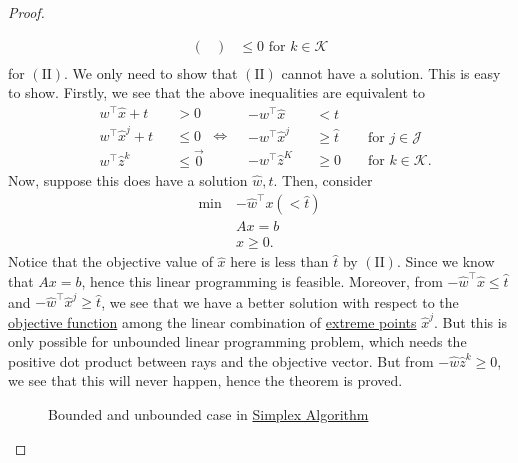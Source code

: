 \begin{proof}
\begin{enumerate}
\[\begin{split}
\begin{pmatrix}
				                   \end{pmatrix} & \leq 0 \text{ for }k\in\mathcal{K} \\
			      \end{split}
		      \]
		      for \((\mathrm{II})\). We only need to show that \((\mathrm{II})\) cannot have a solution. This is easy to show. Firstly, we see that the above inequalities are equivalent to
		      \[
			      \begin{alignedat}{3}
				       & w^{\top}\hat{x}+t     &  & >0           \\
				       & w^{\top}\hat{x}^j + t &  & \leq 0       \\
				       & w^{\top}\hat{z}^k     &  & \leq \vec{0}
			      \end{alignedat}\iff\begin{alignedat}{3}
				       & -w^{\top}\hat{x}   &  & <t                                             \\
				       & -w^{\top}\hat{x}^j &  & \geq \hat{t} &  & \text{ for }j\in\mathcal{J}  \\
				       & -w^{\top}\hat{z}^K &  & \geq 0       &  & \text{ for }k\in\mathcal{K}.
			      \end{alignedat}
		      \]
		      Now, suppose this does have a solution \(\hat{w}, \hat{t}\). Then, consider
		      \[
			      \begin{aligned}
				      \min~ & -\hat{w}^{\top}x(<\hat{t}) \\
				            & Ax = b                     \\
				            & x\geq 0.
			      \end{aligned}
		      \]
		      Notice that the objective value of \(\hat{x}\) here is less than \(\hat{t}\) by \((\mathrm{II})\). Since we know that \(Ax = b\), hence this linear programming is feasible. Moreover, from \(-\hat{w}^{\top}\hat{x}\leq \hat{t}\) and \(-\hat{w}^{\top}\hat{x}^j\geq \hat{t}\), we see that we have a better solution with respect to the \hyperref[def:objective-function]{objective function} among the linear combination of \hyperref[def:extreme-point]{extreme points} \(\hat{x}^j\). But this is only possible for unbounded linear programming problem, which needs the positive dot product between rays and the objective vector. But from \(-\hat{w}\hat{z}^k\geq 0\), we see that this will never happen, hence the theorem is proved.
		      \begin{figure}[H]
			      \centering
			      \caption{Bounded and unbounded case in \hyperref[algo:simplex-algorithm]{Simplex Algorithm}}
			      \label{fig:representation-theorem}
		      \end{figure}
	\end{enumerate}
\end{proof}

